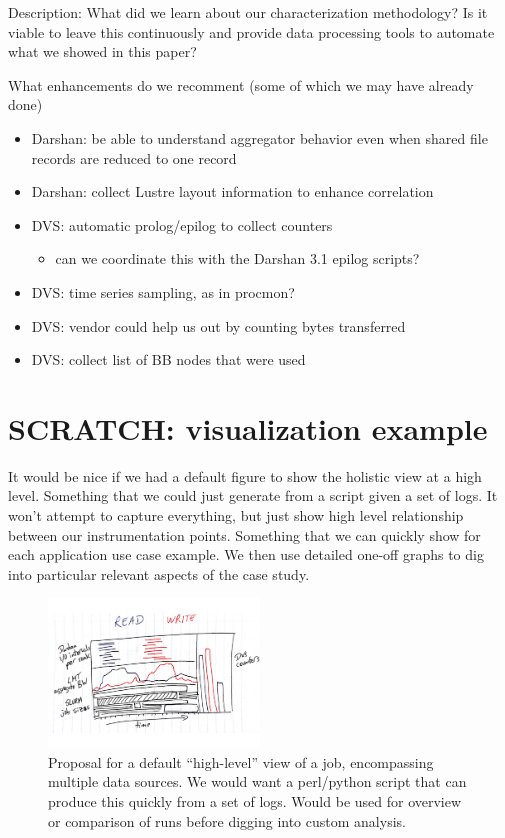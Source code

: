 \documentclass[conference,10pt,compsocconf]{IEEEtran}
\begin{document}
Description: What did we learn about our characterization methodology?  Is it
viable to leave this continuously and provide data processing tools to
automate what we showed in this paper?

What enhancements do we recomment (some of which we may have already done)
\begin{itemize}
\item Darshan: be able to understand aggregator behavior even when shared
file records are reduced to one record
\item Darshan: collect Lustre layout information to enhance correlation
\item DVS: automatic prolog/epilog to collect counters
    \begin{itemize}
    \item can we coordinate this with the Darshan 3.1 epilog scripts?
    \end{itemize}
\item DVS: time series sampling, as in procmon?
\item DVS: vendor could help us out by counting bytes transferred
\item DVS: collect list of BB nodes that were used
\end{itemize}

\section{SCRATCH: visualization example}

It would be nice if we had a default figure to show the holistic view at a
high level.  Something that we could just generate from a script given a set
of logs.  It won't attempt to capture everything, but just show high level
relationship between our instrumentation points.  Something that we can
quickly show for each application use case example.  We then use detailed
one-off graphs to dig into particular relevant aspects of the case study.

\begin{figure}
\centering
\includegraphics[width=0.5\textwidth]{figs/holio-fig-sketch.pdf}
\caption{Proposal for a default ``high-level'' view of a job, encompassing
multiple data sources.  We would want a perl/python script that can produce
this quickly from a set of logs.  Would be used for overview or comparison of
runs before digging into custom analysis.}
\label{fig:holio-fig-sketch}
\end{figure}
\end{document}
